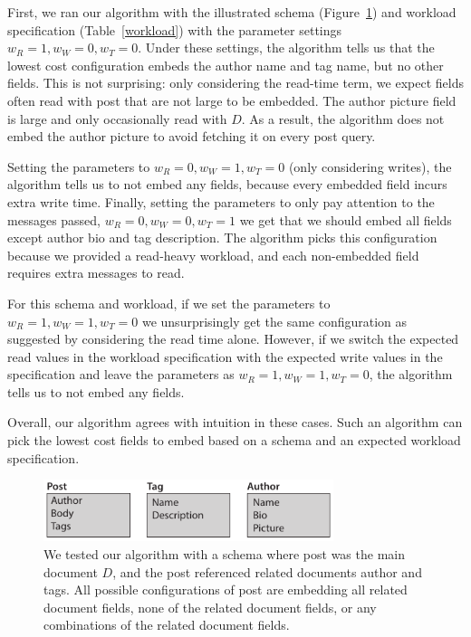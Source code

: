 First, we ran our algorithm with the illustrated schema (Figure~\ref{fig:schema}) and workload specification (Table~\ref{workload}) with the parameter settings $w_R = 1, w_W = 0, w_T = 0$. Under these settings, the algorithm tells us that the lowest cost configuration embeds the author name and tag name, but no other fields. 
This is not surprising: only considering the read-time term, we expect fields often read with post that are not large to be embedded. 
The author picture field is large and only occasionally read with $D$.
As a result, the algorithm does not embed the author picture to avoid fetching it on every post query.

Setting the parameters to $w_R = 0, w_W = 1, w_T = 0$ (only considering writes), the algorithm tells us to not embed any fields, because every embedded field incurs extra write time.
Finally, setting the parameters to only pay attention to the messages passed, $w_R = 0, w_W = 0, w_T = 1$ we get that we should embed all fields except author bio and tag description. 
The algorithm picks this configuration because we provided a read-heavy workload, and each non-embedded field requires extra messages to read. 

For this schema and workload, if we set the parameters to $w_R = 1, w_W = 1, w_T = 0$ we unsurprisingly get the same configuration as suggested by considering the read time alone. 
However, if we switch the expected read values in the workload specification with the expected write values in the specification and leave the parameters as  $w_R = 1, w_W = 1, w_T = 0$, the algorithm tells us to not embed any fields. 

Overall, our algorithm agrees with intuition in these cases. Such an algorithm can pick the lowest cost fields to embed based on a schema and an expected workload specification.

\begin{figure}[t]
\centering
\includegraphics[width=3.33in]{figures/algorithm-schema.pdf}
\caption{We tested our algorithm with a schema where post was the main document $D$, and the post referenced related documents author and tags. All possible configurations of post are embedding all related document fields, none of the related document fields, or any combinations of the related document fields.}
\label{fig:schema}
\end{figure}


